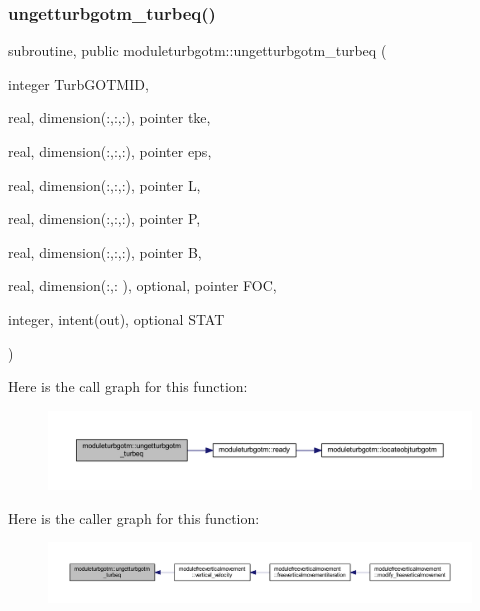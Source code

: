 \subsubsection{\texorpdfstring{ungetturbgotm\+\_\+turbeq()}{ungetturbgotm\_turbeq()}}
{\footnotesize\ttfamily subroutine, public moduleturbgotm\+::ungetturbgotm\+\_\+turbeq (\begin{DoxyParamCaption}\item[{integer}]{Turb\+G\+O\+T\+M\+ID,  }\item[{real, dimension(\+:,\+:,\+:), pointer}]{tke,  }\item[{real, dimension(\+:,\+:,\+:), pointer}]{eps,  }\item[{real, dimension(\+:,\+:,\+:), pointer}]{L,  }\item[{real, dimension(\+:,\+:,\+:), pointer}]{P,  }\item[{real, dimension(\+:,\+:,\+:), pointer}]{B,  }\item[{real, dimension(\+:,\+:  ), optional, pointer}]{F\+OC,  }\item[{integer, intent(out), optional}]{S\+T\+AT }\end{DoxyParamCaption})}

Here is the call graph for this function\+:\nopagebreak
\begin{figure}[H]
\begin{center}
\leavevmode
\includegraphics[width=350pt]{namespacemoduleturbgotm_a4858630313fbbb17b65257d59f9e67ca_cgraph}
\end{center}
\end{figure}
Here is the caller graph for this function\+:\nopagebreak
\begin{figure}[H]
\begin{center}
\leavevmode
\includegraphics[width=350pt]{namespacemoduleturbgotm_a4858630313fbbb17b65257d59f9e67ca_icgraph}
\end{center}
\end{figure}
\mbox{\label{namespacemoduleturbgotm_a471003d8ec76b83e26d91b8ed4815546}} 
